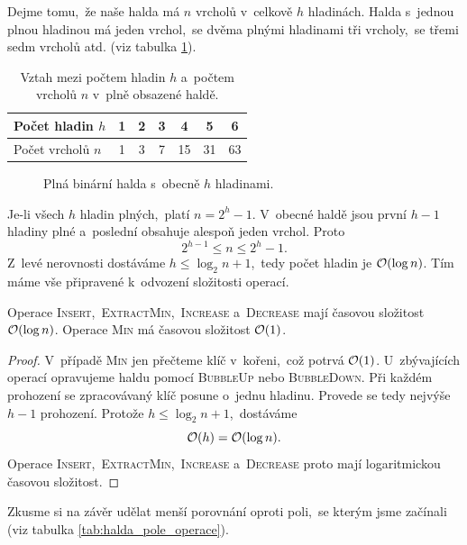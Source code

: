 Dejme tomu,~že naše halda má $n$ vrcholů v~celkově $h$ hladinách. Halda s~jednou plnou hladinou má jeden vrchol,~se dvěma plnými hladinami tři vrcholy,~se třemi sedm vrcholů atd. (viz tabulka \ref{tab:halda_vrcholy_hladiny}).
\begin{table}[ht]
    \centering
    \begin{tabular}{|l|c|c|c|c|c|c|}
        \hline
        Počet hladin $h$  & 1 & 2 & 3 & 4  & 5  & 6  \\ \hline
        Počet vrcholů $n$ & 1 & 3 & 7 & 15 & 31 & 63 \\ \hline
    \end{tabular}
    \caption{Vztah mezi počtem hladin $h$ a~počtem vrcholů $n$ v~plně obsazené haldě.}
    \label{tab:halda_vrcholy_hladiny}
\end{table}
\begin{figure}[ht]
    \centering
    
    \caption{Plná binární halda s~obecně $h$ hladinami.}
    \label{fig:halda_hladiny}
\end{figure}
Je-li všech $h$ hladin plných,~platí $n=2^h-1$. V~obecné haldě jsou první $h-1$ hladiny plné a~poslední obsahuje alespoň jeden vrchol. Proto
\[2^{h-1}\leqslant n\leqslant 2^h-1.\]
Z~levé nerovnosti dostáváme $h\leqslant\log_2 n+1$,~tedy počet hladin je $\mathcal{O}(\log n)$. Tím máme vše připravené k~odvození složitosti operací.
\begin{theorem}
    Operace \textsc{Insert},~\textsc{ExtractMin},~\textsc{Increase} a~\textsc{Decrease} mají časovou složitost $\mathcal{O}(\log{n})$. Operace \textsc{Min} má časovou složitost $\mathcal{O}(1)$.
\end{theorem}
\begin{proof}
    V~případě \textsc{Min} jen přečteme klíč v~kořeni,~což potrvá $\mathcal{O}(1)$. U~zbývajících operací opravujeme haldu pomocí \textsc{BubbleUp} nebo \textsc{BubbleDown}. Při každém prohození se zpracovávaný klíč posune o~jednu hladinu. Provede se tedy nejvýše $h-1$ prohození. Protože $h\leqslant\log_2 n+1$,~dostáváme
    \[\mathcal{O}(h)=\mathcal{O}(\log n).\]
    Operace \textsc{Insert},~\textsc{ExtractMin},~\textsc{Increase} a~\textsc{Decrease} proto mají logaritmickou časovou složitost.
\end{proof}
Zkusme si na závěr udělat menší porovnání oproti poli,~se kterým jsme začínali (viz tabulka \ref{tab:halda_pole_operace}).
